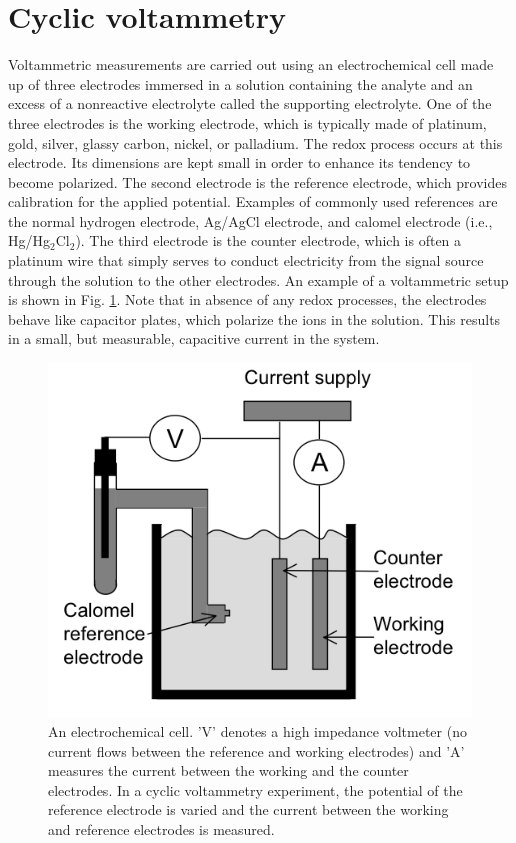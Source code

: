 \documentclass[byrevtex,amssymb,aps,pra,floatfix,letterpaper]{revtex4}
\begin{document}
\section{Cyclic voltammetry}

Voltammetric measurements are carried out using an electrochemical cell made up of three electrodes immersed in a solution containing the analyte and an excess of a nonreactive electrolyte called the supporting electrolyte. One of the three electrodes is the working electrode, which is typically made of platinum, gold, silver, glassy carbon, nickel, or palladium. The redox process occurs at this electrode. Its dimensions are kept small in order to enhance its tendency to become polarized. The second electrode is the reference electrode, which provides calibration for the applied potential. Examples of commonly used references are the normal hydrogen electrode, Ag/AgCl electrode, and calomel electrode (i.e., Hg/Hg$_2$Cl$_2$). The third electrode is the counter electrode, which is often a platinum wire that simply serves to conduct electricity from the signal source through the solution to the other electrodes. An example of a voltammetric setup is
shown in Fig. \ref{fig2}. Note that in absence of any redox processes, the electrodes behave like capacitor plates, which polarize the ions in the solution. This results in a small, but measurable, capacitive current in the system.

\begin{figure}[!htp]
\begin{center}
\includegraphics[scale=0.3]{cell}
\caption{An electrochemical cell. 'V' denotes a high impedance voltmeter (no current flows between the reference and working electrodes) and 'A' measures the current between the working and the counter electrodes. In a cyclic voltammetry experiment, the potential of the reference electrode is varied and the current between the working and reference electrodes is measured.}
\label{fig2}
\end{center}
\end{figure}
\end{document}
